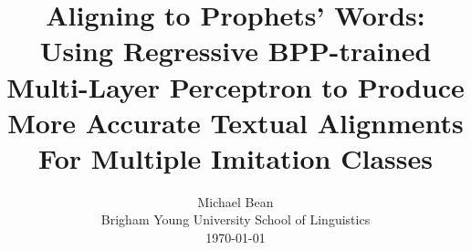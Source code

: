 \title{Aligning to Prophets' Words:\\
Using Regressive BPP-trained Multi-Layer Perceptron to Produce More Accurate Textual Alignments For Multiple Imitation Classes}

\author{Michael Bean\\
Brigham Young University School of Linguistics\\
\today}
\maketitle
